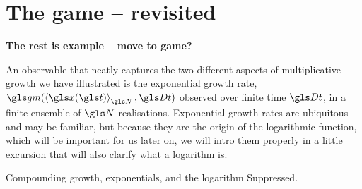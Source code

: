 \section{The game -- revisited}
\textbf{The rest is example -- move to game?}

An observable that neatly captures the two different 
aspects of multiplicative growth we have illustrated is the exponential growth rate, $\gm(\ave{\x(\t)}_\N, \Dt)$ 
observed over finite time $\Dt$, in a finite ensemble
of $\N$ realisations. Exponential growth rates are ubiquitous and may be familiar, but because they are the origin of the logarithmic function, which will be important for us later on, we will intro them properly in a little excursion that will also clarify what a logarithm is.

\begin{excursion}{Compounding growth, exponentials, and the logarithm}
Suppressed.
%

\end{excursion}
